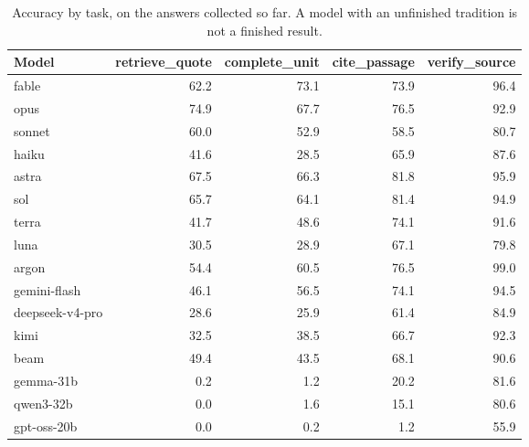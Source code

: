 \begin{table}[t]
\centering
\caption{Accuracy by task, on the answers collected so far. A model with an unfinished tradition is not a finished result.}
\label{tab:accuracy-task}
\begin{tabular}{lrrrr}
\toprule
\textbf{Model} & \textbf{retrieve\_quote} & \textbf{complete\_unit} & \textbf{cite\_passage} & \textbf{verify\_source} \\
\midrule
fable & 62.2 & 73.1 & 73.9 & 96.4 \\
opus & 74.9 & 67.7 & 76.5 & 92.9 \\
sonnet & 60.0 & 52.9 & 58.5 & 80.7 \\
haiku & 41.6 & 28.5 & 65.9 & 87.6 \\
astra & 67.5 & 66.3 & 81.8 & 95.9 \\
sol & 65.7 & 64.1 & 81.4 & 94.9 \\
terra & 41.7 & 48.6 & 74.1 & 91.6 \\
luna & 30.5 & 28.9 & 67.1 & 79.8 \\
argon & 54.4 & 60.5 & 76.5 & 99.0 \\
gemini-flash & 46.1 & 56.5 & 74.1 & 94.5 \\
deepseek-v4-pro & 28.6 & 25.9 & 61.4 & 84.9 \\
kimi & 32.5 & 38.5 & 66.7 & 92.3 \\
beam & 49.4 & 43.5 & 68.1 & 90.6 \\
gemma-31b & 0.2 & 1.2 & 20.2 & 81.6 \\
qwen3-32b & 0.0 & 1.6 & 15.1 & 80.6 \\
gpt-oss-20b & 0.0 & 0.2 & 1.2 & 55.9 \\
\bottomrule
\end{tabular}
\end{table}
